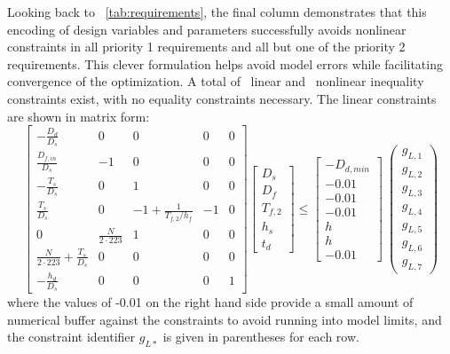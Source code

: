 Looking back to \tablename~\ref{tab:requirements}, the final column demonstrates that this encoding of design variables and parameters successfully avoids nonlinear constraints in all priority 1 requirements and all but one of the priority 2 requirements.
This clever formulation helps avoid model errors while facilitating convergence of the optimization.
A total of \numLinConstraints~linear and \numNonlinConstraints~nonlinear inequality constraints exist, with no equality constraints necessary.
The linear constraints are shown in matrix form:
\begin{equation}
    \begin{bmatrix}
    -\frac{D_d}{D_s} & 0 & 0 & 0 & 0\\
    \frac{D_{f,in}}{D_s} & -1 & 0 & 0& 0 \\
    -\frac{T_s}{D_s} & 0 & 1 & 0& 0 \\
    \frac{T_s}{D_s} & 0 & -1+\frac{1}{T_{f,2}/h_f} & -1 & 0\\
    0 & \frac{N}{2\cdot223} & 1 & 0& 0 \\
    \frac{N}{2\cdot223}  + \frac{T_s}{D_s} & 0 & 0 & 0 & 0\\
    -\frac{h_d}{D_s} & 0 & 0 & 0 & 1
    \end{bmatrix}
    \begin{bmatrix} D_s \\ D_f \\ T_{f,2} \\ h_s \\ t_d
    \end{bmatrix}
    \leq
    \begin{bmatrix}
    -D_{d,min} \\ -0.01 \\ -0.01 \\ -0.01 \\ h \\ h \\ -0.01
    \end{bmatrix}~
    \begin{pmatrix}
    g_{L,1} \\ g_{L,2} \\ g_{L,3} \\g_{L,4} \\ g_{L,5} \\ g_{L,6} \\ g_{L,7}
    \end{pmatrix}
\end{equation}
where the values of -0.01 on the right hand side provide a small amount of numerical buffer against the constraints to avoid running into model limits, and the constraint identifier $g_{L*}$ is given in parentheses for each row.


